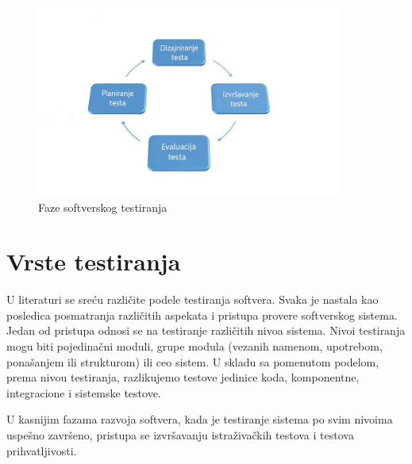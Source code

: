 \documentclass[12pt,oneside]{memoir}
\begin{document}
\begin{figure}[!ht]
  \centering
  \includegraphics[width=0.9\textwidth]{faze.jpg}
  \caption{Faze softverskog testiranja}
  \label{fig:faze}
\end{figure}  

\section{Vrste testiranja} \label{broj2}

U literaturi se sreću različite podele testiranja softvera. Svaka je nastala kao posledica posmatranja različitih aspekata i pristupa provere softverskog sistema.
Jedan od pristupa odnosi se na testiranje različitih nivoa sistema. Nivoi testiranja mogu biti pojedinačni moduli, grupe modula (vezanih namenom, upotrebom, ponašanjem ili strukturom) ili ceo sistem.
U skladu sa pomenutom podelom, prema nivou testiranja, razlikujemo testove jedinice koda, komponentne, integracione i sistemske testove.
\par
U kasnijim fazama razvoja softvera, kada je testiranje sistema po svim nivoima uspešno završeno, pristupa se izvršavanju istraživačkih testova i testova prihvatljivosti.
\par
\end{document}
